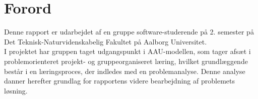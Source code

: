 \section*{Forord}
Denne rapport er udarbejdet af en gruppe software-studerende på 2. semester på Det Teknisk-Naturvidenskabelig Fakultet på Aalborg Universitet.\\

I projektet har gruppen taget udgangspunkt i AAU-modellen, som tager afsæt i problemorienteret projekt- og gruppeorganiseret læring, hvilket grundlæggende består i en læringsproces, der indledes med en problemanalyse. Denne analyse danner herefter grundlag for rapportens videre bearbejdning af problemets løsning.